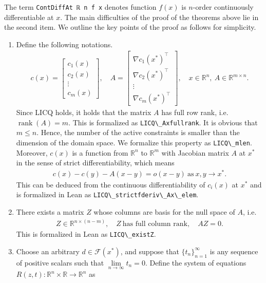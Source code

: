 \documentclass[sn-mathphys]{JORSC-jnl}%
\theoremstyle{thmstyleone}%
\theoremstyle{thmstylethree}%
\newcommand{\lean}[1]{\lstinline[language=lean, mathescape=true]{#1}}
\begin{document}
The term \lean{ContDiffAt ℝ n f x} denotes function $f(x)$ is $n$-order continuously differentiable at $x$. The main difficulties of the proof of the theorems above lie in the second item. We outline the key points of the proof as follows for simplicity.
\begin{enumerate}
\item Define the following notations.
\begin{align*}
    c(x) = \begin{bmatrix}
        c_1(x)\\c_2(x)\\ \vdots\\c_m(x)
    \end{bmatrix},\quad A = \begin{bmatrix}
        \nabla c_1(x^\ast)^\top\\\nabla c_2(x^\ast)^\top\\ \vdots\\\nabla c_m(x^\ast)^\top
    \end{bmatrix},\quad x\in \mathbb{R}^n,\ A \in \mathbb{R}^{m \times n}.
\end{align*}
Since LICQ holds, it holds that the matrix $A$ has full row rank, i.e. $\operatorname{rank}(A) = m$. This is formalized as \lean{LICQ\_Axfullrank}. It is obvious that $m \leqslant n$. Hence, the number of the active constraints is smaller than the dimension of the domain space. We formalize this property as \lean{LICQ\_mlen}. Moreover, $c(x)$ is a function from $\mathbb{R}^n$ to $\mathbb{R}^m$ with Jacobian matrix $A$ at $x^\ast$ in the sense of strict differentiability, which means
\begin{align*}
    c(x) - c(y) - A(x - y) = o(x - y)\ \text{as}\ x, y \to x^\ast.
\end{align*}
This can be deduced from the continuous differentiability of $c_i(x)$ at $x^\ast$ and is formalized in Lean as \lean{LICQ\_strictfderiv\_Ax\_elem}.
\item There exists a matrix $Z$ whose columns are basis for the null space of $A$, i.e.
\begin{align*}
    Z \in\mathbb{R}^{n\times (n-m)},\quad Z \ \text{has full column rank},\quad AZ = 0.
\end{align*}
This is formalized in Lean as \lean{LICQ\_existZ}.
\item Choose an arbitrary $d \in \mathcal{F}(x^\ast)$, and suppose that $\{t_n\}_{n=1}^\infty$ is any sequence of positive scalars such that $\lim\limits_{n\to\infty}t_n = 0$. Define the system of equations $R(z,t) : \mathbb{R}^n \times \mathbb{R} \to \mathbb{R}^n $ as

\end{enumerate}
\end{document}
